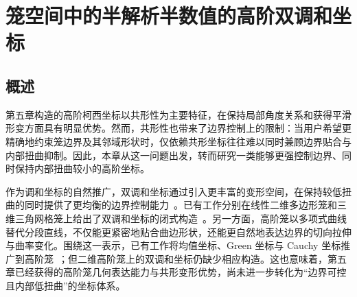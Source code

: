 \chapter{笼空间中的半解析半数值的高阶双调和坐标}

\providecommand{\Bezier}{B\'{e}zier }
\providecommand{\tr}[1]{#1}
\providecommand{\tb}[1]{#1}
\providecommand{\todo}[1]{}
\providecommand{\argmin}{\mathop{\mathrm{arg\,min}}\limits}
\providecommand{\argmax}{\mathop{\mathrm{arg\,max}}\limits}
\providecommand{\res}{\mathop{\mathrm{Res}}}
\providecommand{\re}{\mathop{\mathrm{Re}}}
\providecommand{\im}{\mathop{\mathrm{Im}}}

\makeatletter
{}
\makeatother

\def \ma {\mathbf{a}}
\def \mb {\mathbf{b}}
\def \mc {\mathbf{c}}
\def \md {\mathbf{d}}
\def \me {\mathbf{e}}
\def \mf {\mathbf{f}}
\def \mg {\mathbf{g}}
\def \mh {\mathbf{h}}
\def \mi {\mathbf{i}}
\def \mj {\mathbf{j}}
\def \mk {\mathbf{k}}
\def \ml {\mathbf{l}}
\def \mm {\mathbf{m}}
\def \mn {\mathbf{n}}
\def \mo {\mathbf{o}}
\def \mp {\mathbf{p}}
\def \mq {\mathbf{q}}
\def \mr {\mathbf{r}}
\def \ms {\mathbf{s}}
\def \mt {\mathbf{t}}
\def \muu {\mathbf{u}}
\def \mv {\mathbf{v}}
\def \mw {\mathbf{w}}
\def \mx {\mathbf{x}}
\def \my {\mathbf{y}}
\def \mz {\mathbf{z}}

\section{概述}\label{sec:chap5-overview}
第五章构造的高阶柯西坐标以共形性为主要特征，在保持局部角度关系和获得平滑形变方面具有明显优势。然而，共形性也带来了边界控制上的限制：当用户希望更精确地约束笼边界及其邻域形状时，仅依赖共形坐标往往难以同时兼顾边界贴合与内部扭曲抑制。因此，本章从这一问题出发，转而研究一类能够更强控制边界、同时保持内部扭曲较小的高阶坐标。

作为调和坐标的自然推广，双调和坐标通过引入更丰富的变形空间，在保持较低扭曲的同时提供了更均衡的边界控制能力~\cite{Weber2012,thiery2024biharmonic}。已有工作分别在线性二维多边形笼和三维三角网格笼上给出了双调和坐标的闭式构造~\cite{Weber2012,thiery2024biharmonic}。另一方面，高阶笼以多项式曲线替代分段直线，不仅能更紧密地贴合曲边形状，还能更自然地表达边界的切向拉伸与曲率变化。围绕这一表示，已有工作将均值坐标、Green 坐标与 Cauchy 坐标推广到高阶笼~\cite{Li2013,MichelThiery2023,Lin2024PolynomialCC,liu2024polygc}；但二维高阶笼上的双调和坐标仍缺少相应构造。这也意味着，第五章已经获得的高阶笼几何表达能力与共形变形优势，尚未进一步转化为“边界可控且内部低扭曲”的坐标体系。

